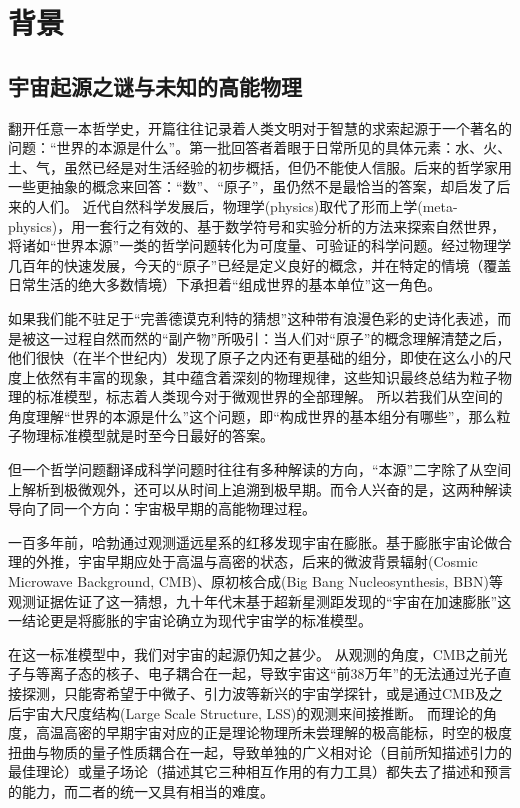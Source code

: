 

\chapter{背景}

\section{宇宙起源之谜与未知的高能物理}

翻开任意一本哲学史，开篇往往记录着人类文明对于智慧的求索起源于一个著名的问题：“世界的本源是什么”。第一批回答者着眼于日常所见的具体元素：水、火、土、气，虽然已经是对生活经验的初步概括，但仍不能使人信服。后来的哲学家用一些更抽象的概念来回答：“数”、“原子”，虽仍然不是最恰当的答案，却启发了后来的人们。
近代自然科学发展后，物理学(physics)取代了形而上学(meta-physics)，用一套行之有效的、基于数学符号和实验分析的方法来探索自然世界，将诸如“世界本源”一类的哲学问题转化为可度量、可验证的科学问题。经过物理学几百年的快速发展，今天的“原子”已经是定义良好的概念，并在特定的情境（覆盖日常生活的绝大多数情境）下承担着“组成世界的基本单位”这一角色。

如果我们能不驻足于“完善德谟克利特的猜想”这种带有浪漫色彩的史诗化表述，而是被这一过程自然而然的“副产物”所吸引：当人们对“原子”的概念理解清楚之后，他们很快（在半个世纪内）发现了原子之内还有更基础的组分，即使在这么小的尺度上依然有丰富的现象，其中蕴含着深刻的物理规律，这些知识最终总结为粒子物理的标准模型，标志着人类现今对于微观世界的全部理解。
所以若我们从空间的角度理解“世界的本源是什么”这个问题，即“构成世界的基本组分有哪些”，那么粒子物理标准模型就是时至今日最好的答案。

但一个哲学问题翻译成科学问题时往往有多种解读的方向，“本源”二字除了从空间上解析到极微观外，还可以从时间上追溯到极早期。而令人兴奋的是，这两种解读导向了同一个方向：宇宙极早期的高能物理过程。

一百多年前，哈勃通过观测遥远星系的红移发现宇宙在膨胀。基于膨胀宇宙论做合理的外推，宇宙早期应处于高温与高密的状态，后来的微波背景辐射(Cosmic Microwave Background, CMB)、原初核合成(Big Bang Nucleosynthesis, BBN)等观测证据佐证了这一猜想，九十年代末基于超新星测距发现的“宇宙在加速膨胀”这一结论更是将膨胀的宇宙论确立为现代宇宙学的标准模型。

在这一标准模型中，我们对宇宙的起源仍知之甚少。
从观测的角度，CMB之前光子与等离子态的核子、电子耦合在一起，导致宇宙这“前38万年”的无法通过光子直接探测，只能寄希望于中微子、引力波等新兴的宇宙学探针，或是通过CMB及之后宇宙大尺度结构(Large Scale Structure, LSS)的观测来间接推断。
而理论的角度，高温高密的早期宇宙对应的正是理论物理所未尝理解的极高能标，时空的极度扭曲与物质的量子性质耦合在一起，导致单独的广义相对论（目前所知描述引力的最佳理论）或量子场论（描述其它三种相互作用的有力工具）都失去了描述和预言的能力，而二者的统一又具有相当的难度。

